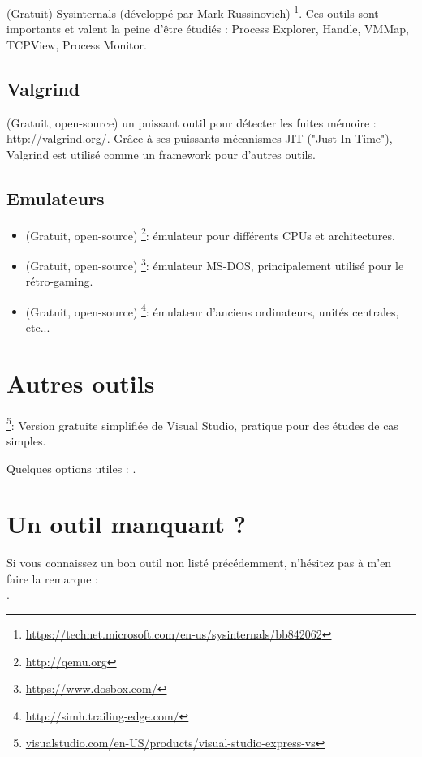 (Gratuit) Sysinternals (développé par Mark Russinovich)
\footnote{\url{https://technet.microsoft.com/en-us/sysinternals/bb842062}}.
Ces outils sont importants et valent la peine d'être étudiés : Process Explorer, Handle, VMMap, TCPView, Process Monitor.

\subsection{Valgrind}

(Gratuit, open-source) un puissant outil pour détecter les fuites mémoire : \url{http://valgrind.org/}.
Grâce à ses puissants mécanismes \ac{JIT} ("Just In Time"), Valgrind est utilisé comme un framework pour d'autres outils.


\subsection{Emulateurs}

\begin{itemize}
\item (Gratuit, open-source) \footnote{\url{http://qemu.org}}: émulateur pour différents CPUs et architectures.

\item (Gratuit, open-source) \footnote{\url{https://www.dosbox.com/}}: émulateur MS-DOS, principalement utilisé pour le rétro-gaming.

\item (Gratuit, open-source) \footnote{\url{http://simh.trailing-edge.com/}}: émulateur d'anciens ordinateurs, unités centrales, etc...
\end{itemize}

\section{Autres outils}

\footnote{\href{http://go.yurichev.com/17034}{visualstudio.com/en-US/products/visual-studio-express-vs}}:
Version gratuite simplifiée de Visual Studio, pratique pour des études de cas simples.

Quelques options utiles : .


\section{Un outil manquant ?}

Si vous connaissez un bon outil non listé précédemment, n'hésitez pas à m'en faire la remarque : \\
\TT{\EMAIL}.

